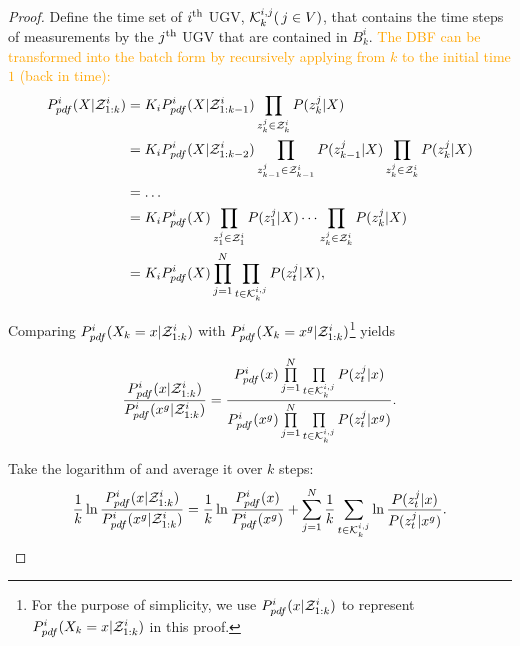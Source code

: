	\begin{proof}	
		Define the time set of $i^\text{th}$ UGV, $\mathcal{K}^{i,j}_{k}(\,j\in V)$, that contains the time steps of measurements by the $j^\text{th}$ UGV that are contained in $B^i_k$.		
		\textcolor{orange}{The DBF can be transformed into the batch form by recursively applying  from $k$ to the initial time $1$ (back in time):}
		\textcolor{orange}{
		\small\begin{align*}
		P^i_{pdf}(\X|\Z^i_{1:k})&=K_iP^i_{pdf}(\X|\Z^i_{1:k-1})\prod\limits_{z^j_k\in\Z^i_k}P(z^j_k|\X)\\
		&=K_iP^i_{pdf}(\X|\Z^i_{1:k-2})\prod\limits_{z^j_{k-1}\in\Z^i_{k-1}}P(z^j_{k-1}|\X)\prod\limits_{z^j_k\in\Z^i_k}P(z^j_k|\X)\\
		&=\dots\\
		&=K_iP^i_{pdf}(\X)\prod\limits_{z^j_1\in\Z^i_1}P(z^j_1|\X)\dots\prod\limits_{z^j_k\in\Z^i_k}P(z^j_k|\X)\\ %
		&=K_iP^i_{pdf}(\X)\prod\limits_{j=1}^{N}\prod\limits_{t\in\K^{i,j}_{k}}P(z^j_t|\X),
		\end{align*}\normalsize}
		
		Comparing $P^i_{pdf}(X_k=x|\mathcal{Z}^i_{1:k})$ with $P^i_{pdf}(X_k=x^g|\mathcal{Z}^i_{1:k})$\footnote{For the purpose of simplicity, we use $P^i_{pdf}(x|\mathcal{Z}^i_{1:k})$ to represent $P^i_{pdf}(X_k=x|\mathcal{Z}^i_{1:k})$ in this proof.} yields
		
		\small\begin{equation}\label{eqn:cmp}
		\frac{P^i_{pdf}(x|\mathcal{Z}^i_{1:k})}{P^i_{pdf}(x^g|\mathcal{Z}^i_{1:k})}=\frac{P^i_{pdf}(x)\prod\limits_{j=1}^{N}\prod\limits_{t\in\mathcal{K}^{i,j}_{k}}P(z^j_t|x)}{P^i_{pdf}(x^g)\prod\limits_{j=1}^{N}\prod\limits_{t\in\mathcal{K}^{i,j}_{k}}P(z^j_t|x^g)}.
		\end{equation}\normalsize
		
		Take the logarithm of  and average it over $k$ steps:
		\small\begin{equation}\label{eqn:cmp_log}
		\frac{1}{k}\ln\frac{P^i_{pdf}(x|\mathcal{Z}^i_{1:k})}{P^i_{pdf}(x^g|\mathcal{Z}^i_{1:k})}=\frac{1}{k}\ln\frac{P^i_{pdf}(x)}{P^i_{pdf}(x^g)}+\sum\limits_{j=1}^{N}\frac{1}{k}\sum\limits_{t\in\mathcal{K}^{i,j}_{k}}\ln\frac{P(z^j_t|x)}{P(z^j_t|x^g)}.
		\end{equation}\normalsize
		

\end{proof}
